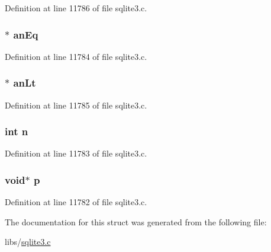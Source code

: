 Definition at line 11786 of file sqlite3.\+c.

\hypertarget{struct_index_sample_a5469081a172819424771bb89f5dc97e8}{}
\subsubsection[{an\+Eq}]{$\ast$ an\+Eq}\label{struct_index_sample_a5469081a172819424771bb89f5dc97e8}


Definition at line 11784 of file sqlite3.\+c.

\hypertarget{struct_index_sample_a7df8b6cba688742d6f5dc9579f8ec291}{}
\subsubsection[{an\+Lt}]{$\ast$ an\+Lt}\label{struct_index_sample_a7df8b6cba688742d6f5dc9579f8ec291}


Definition at line 11785 of file sqlite3.\+c.

\hypertarget{struct_index_sample_a76f11d9a0a47b94f72c2d0e77fb32240}{}
\subsubsection[{n}]{\setlength{\rightskip}{0pt plus 5cm}int n}\label{struct_index_sample_a76f11d9a0a47b94f72c2d0e77fb32240}


Definition at line 11783 of file sqlite3.\+c.

\hypertarget{struct_index_sample_a117104b82864d3b23ec174af6d392709}{}
\subsubsection[{p}]{\setlength{\rightskip}{0pt plus 5cm}void$\ast$ p}\label{struct_index_sample_a117104b82864d3b23ec174af6d392709}


Definition at line 11782 of file sqlite3.\+c.



The documentation for this struct was generated from the following file\+:\begin{DoxyCompactItemize}
\item 
libs/\hyperlink{sqlite3_8c}{sqlite3.\+c}\end{DoxyCompactItemize}
